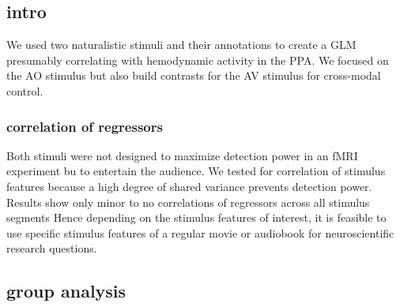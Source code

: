 \documentclass[english]{article}
\begin{document}



\subsection{intro}
We used two naturalistic stimuli and their annotations to create a GLM
presumably correlating with hemodynamic activity in the PPA. We focused on the
AO stimulus but also build contrasts for the AV stimulus for cross-modal
control.

\subsubsection{correlation of regressors} Both stimuli were not designed to
maximize detection power in an fMRI experiment bu to entertain the audience.
We tested for correlation of stimulus features because a high degree of shared
variance prevents detection power.
Results show only minor to no correlations of regressors across all stimulus
segments
Hence depending on the stimulus features of interest, it is feasible to use
specific stimulus features of a regular movie or audiobook for neuroscientific
research questions.


\subsection{group analysis}
\end{document}
